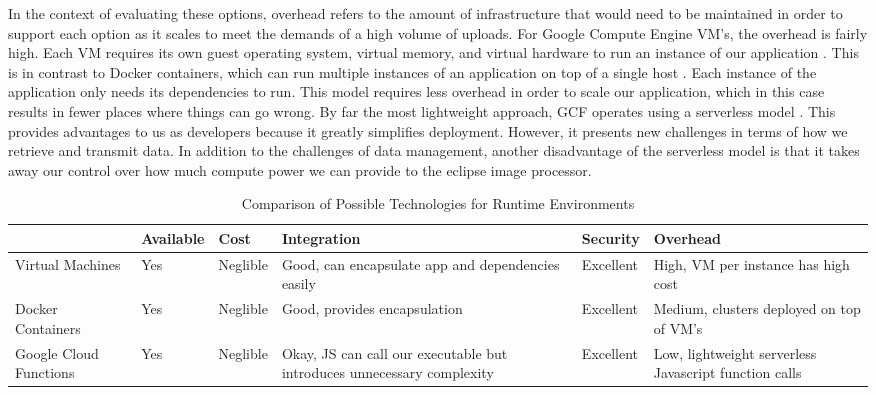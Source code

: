 \documentclass[10pt, onecolumn, draftclsnofoot, letterpaper, compsoc]{IEEEtran}
\begin{document}
In the context of evaluating these options, overhead refers to the amount of
infrastructure that would need to be maintained in order to support each option
as it scales to meet the demands of a high volume of uploads. For Google Compute
Engine VM’s, the overhead is fairly high. Each VM requires its own guest
operating system, virtual memory, and virtual hardware to run an instance of our
application \cite{docker, gcf}. This is in contrast to Docker containers, which
can run multiple instances of an application on top of a single host
\cite{docker}. Each instance of the application only needs its dependencies to
run. This model requires less overhead in order to scale our application, which
in this case results in fewer places where things can go wrong. By far the most
lightweight approach, GCF operates using a serverless model \cite{gcp}. This
provides advantages to us as developers because it greatly simplifies
deployment. However, it presents new challenges in terms of how we retrieve and
transmit data. In addition to the challenges of data management, another
disadvantage of the serverless model is that it takes away our control over how
much compute power we can provide to the eclipse image processor. \\

\begin{table}[h]
\centering
\caption{Comparison of Possible Technologies for Runtime Environments}
\begin{tabular}{|p{2.1cm}|p{2.1cm}|p{2.1cm}|p{2.1cm}|p{2.1cm}|p{2.1cm}|}
\cline{4-4}

\hline  & Available & Cost & Integration & Security & Overhead \\ \hline

Virtual Machines & Yes & Neglible & Good, can encapsulate app and dependencies
easily &  Excellent & High, VM per instance has high cost  \\ \hline

Docker Containers  & Yes & Neglible & Good, provides encapsulation &  Excellent
& Medium, clusters deployed on top of VM’s  \\ \hline

Google Cloud Functions  & Yes & Neglible & Okay, JS can call our executable but
introduces unnecessary complexity & Excellent & Low, lightweight serverless
Javascript function calls  \\ \hline

\end{tabular}
\label{table:george2}
\end{table}
\end{document}
